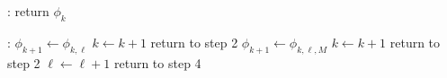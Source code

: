 \begin{algorithm}
\begin{algorithmic}
:
    \State return $\phi_{k}$
\EndIf

:
    \State $\phi_{k+1} \gets \phi_{k,\ell}$
    \State $k \gets k+1$
    \State return to step 2
    \State $\phi_{k+1} \gets \phi_{k,\ell,M}$
    \State $k \gets k+1$
    \State return to step 2
\Else
    \State $\ell \gets \ell+1$
    \State return to step 4
\EndIf

\end{algorithmic}
\end{algorithm}